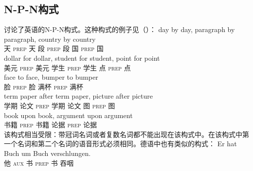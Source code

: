 \begin{exe}
\begin{xlist}[iv.]
\begin{exe}
\begin{xlist}[iv.]
\subsection{N-P-N构式}
\label{Abschnitt-NPN-Konstruktion}

\mbox{} \citet{Jackendoff2008a}讨论了英语的N-P-N构式。这种构式的例子见（）：
\eal
\ex 
\gll day by day, paragraph by paragraph, country by country\\
     天 \textsc{prep} 天 段 \textsc{prep} 段 国 \textsc{prep} 国\\
\ex
\gll dollar for dollar, student for student, point for point\\
     美元 \textsc{prep} 美元 学生 \textsc{prep} 学生 点 \textsc{prep} 点\\
\ex 
\gll face to face, bumper to bumper\\
     脸 \textsc{prep} 脸 满杯 \textsc{prep} 满杯\\
\ex
\gll term paper after term paper, picture after picture\\
     学期 论文 \textsc{prep} 学期 论文 图 \textsc{prep} 图\\
\ex 
\gll book upon book, argument upon argument\\
     书籍 \textsc{prep} 书籍 论据 \textsc{prep} 论据\\
\zl
该构式相当受限：带冠词名词或者复数名词都不能出现在该构式中。在该构式中第一个名词和第二个名词的语音形式必须相同。德语中也有类似的构式：
\eal
\ex 
\gll Er hat Buch um Buch verschlungen.\\
	 他 \textsc{aux} 书 \textsc{prep} 书 吞咽\\

\end{xlist}
\end{exe}
\end{xlist}
\end{exe}
